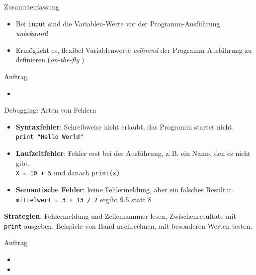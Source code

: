 \begin{frame}[fragile]{Zusammenfassung}
\begin{itemize}
\item Bei \lstinline|input| sind die Variablen-Werte vor der Programm-Ausführung \textit{unbekannt}!
\item Ermöglicht es, flexibel Variablenwerte \textit{während} der Programm-Ausführung zu definieren (\textit{on-the-fly} )
\end{itemize}
\end{frame}

\begin{frame}[fragile]{Auftrag}
\begin{itemize}
\item {}
\end{itemize}
\end{frame}

\begin{frame}[fragile]{Debugging: Arten von Fehlern}
\begin{itemize}
\item \textbf{Syntaxfehler}: Schreibweise nicht erlaubt, das Programm startet nicht.\\
\lstinline|print "Hello World"|
\item \textbf{Laufzeitfehler}: Fehler erst bei der Ausführung, z.\,B. ein Name, den es nicht gibt.\\
\lstinline|X = 10 + 5| und danach \lstinline|print(x)|
\item \textbf{Semantische Fehler}: keine Fehlermeldung, aber ein falsches Resultat.\\
\lstinline|mittelwert = 3 + 13 / 2| ergibt 9.5 statt 8
\end{itemize}
\textbf{Strategien}: Fehlermeldung und Zeilennummer lesen, Zwischenresultate mit \lstinline|print| ausgeben, Beispiele von Hand nachrechnen, mit besonderen Werten testen.
\end{frame}

\begin{frame}{Auftrag}
\begin{itemize}
\item {}
\item {}
\end{itemize}
\end{frame}